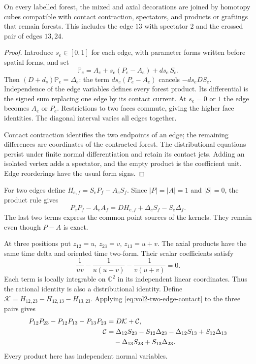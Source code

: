 \begin{theorem}\label{thm:vol2-forest-cubes}
On every labelled forest, the mixed and axial decorations are
joined by homotopy cubes compatible with contact contraction,
spectators, and products or graftings that remain forests.
This includes the edge $13$ with spectator $2$ and the crossed
pair of edges $13,24$.
\end{theorem}

\begin{proof}
Introduce $s_e\in[0,1]$ for each edge, with parameter forms
written before spatial forms, and set
\[
 \mathbb P_e=A_e+s_e(P_e-A_e)+ds_e\,S_e.
\]
Then $(D+d_s)\mathbb P_e=\Delta_e$: the term
$ds_e(P_e-A_e)$ cancels $-ds_eDS_e$.
Independence of the edge variables defines every forest product.
Its differential is the signed sum replacing one edge by its
contact current. At $s_e=0$ or $1$ the edge becomes $A_e$ or
$P_e$. Restrictions to two faces commute, giving the higher
face identities. The diagonal interval varies all edges together.

Contact contraction identifies the two endpoints of an edge;
the remaining differences are coordinates of the contracted
forest. The distributional equations persist under finite normal
differentiation and retain its contact jets. Adding an isolated
vertex adds a spectator, and the empty product is the coefficient
unit. Edge reorderings have the usual form signs.
\end{proof}

For two edges define $H_{e,f}=S_eP_f-A_eS_f$. Since
$|P|=|A|=1$ and $|S|=0$, the product rule gives
\begin{equation}\label{eq:vol2-two-edge-contact}
 P_eP_f-A_eA_f
 =DH_{e,f}+\Delta_eS_f-S_e\Delta_f.
\end{equation}
The last two terms express the common point sources of the
kernels. They remain even though $P-A$ is exact.

At three positions put $z_{12}=u$, $z_{23}=v$, $z_{13}=u+v$.
The axial products have the same time delta and oriented time
two-form. Their scalar coefficients satisfy
\[
 \frac1{uv}-\frac1{u(u+v)}-\frac1{v(u+v)}=0.
\]
Each term is locally integrable on $\mathbb C^2$ in its
independent linear coordinates. Thus the rational identity is
also a distributional identity. Define
$\mathcal K=H_{12,23}-H_{12,13}-H_{13,23}$. Applying
\eqref{eq:vol2-two-edge-contact} to the three pairs gives
\begin{align}\label{eq:vol2-three-channel-current}
 P_{12}P_{23}-P_{12}P_{13}-P_{13}P_{23}
 &=D\mathcal K+\mathcal C,\notag\\
 \mathcal C
 &=\Delta_{12}S_{23}-S_{12}\Delta_{23}
   -\Delta_{12}S_{13}+S_{12}\Delta_{13}\notag\\
 &\quad-\Delta_{13}S_{23}+S_{13}\Delta_{23}.
\end{align}
Every product here has independent normal variables.

